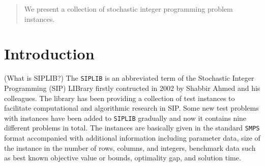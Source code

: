 \author{Yongkyu Cho \and 
		Kibaek Kim \and
        Cong Han Lim \and
        James Luedtke \and
        Jeffrey Linderoth
}



\date{Received: date / Accepted: date}


\maketitle

\begin{abstract}
We present a collection of stochastic integer programming problem instances.
\end{abstract}

\section{Introduction}
(What is SIPLIB?) The \texttt{SIPLIB} \cite{web:SIPLIB1} is an abbreviated term of the Stochastic Integer Programming (SIP) LIBrary firstly contructed in 2002 by Shabbir Ahmed and his colleagues. The library has been providing a collection of test instances to facilitate computational and algorithmic research in SIP. Some new test problems with instances have been added to \texttt{SIPLIB} gradually and now it contains nine different problems in total.  The instances are basically given in the standard \texttt{SMPS} format accompanied with additional information including parameter data, size of the instance in the number of rows, columns, and integers, benchmark data such as best known objective value or bounds, optimality gap, and solution time.

